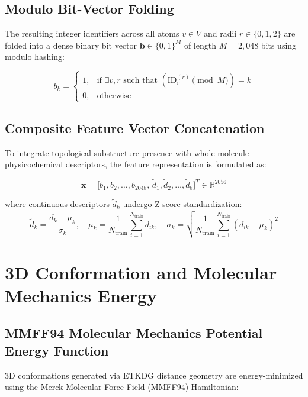 \documentclass[11pt,a4paper]{article}
\begin{document}
\subsection{Modulo Bit-Vector Folding}
The resulting integer identifiers across all atoms $v \in V$ and radii $r \in \{0, 1, 2\}$ are folded into a dense binary bit vector $\mathbf{b} \in \{0, 1\}^M$ of length $M = 2{,}048$ bits using modulo hashing:

\begin{equation}
\label{eq:bit_folding}
b_k = 
\begin{cases}
1, & \text{if } \exists v, r \text{ such that } \left( \text{ID}_v^{(r)} \pmod M \right) = k \\
0, & \text{otherwise}
\end{cases}
\end{equation}

\subsection{Composite Feature Vector Concatenation}
To integrate topological substructure presence with whole-molecule physicochemical descriptors, the feature representation is formulated as:

\begin{equation}
\label{eq:composite_feature}
\mathbf{x} = \Big[ b_1, b_2, \dots, b_{2048}, \, \tilde{d}_1, \tilde{d}_2, \dots, \tilde{d}_8 \Big]^T \in \mathbb{R}^{2056}
\end{equation}

\noindent where continuous descriptors $\tilde{d}_k$ undergo Z-score standardization:
\begin{equation}
\tilde{d}_k = \frac{d_k - \mu_k}{\sigma_k}, \quad \mu_k = \frac{1}{N_{\text{train}}}\sum_{i=1}^{N_{\text{train}}} d_{ik}, \quad \sigma_k = \sqrt{\frac{1}{N_{\text{train}}}\sum_{i=1}^{N_{\text{train}}} (d_{ik} - \mu_k)^2}
\end{equation}

\section{3D Conformation and Molecular Mechanics Energy}

\subsection{MMFF94 Molecular Mechanics Potential Energy Function}
3D conformations generated via ETKDG distance geometry are energy-minimized using the Merck Molecular Force Field (MMFF94) Hamiltonian:
\end{document}
